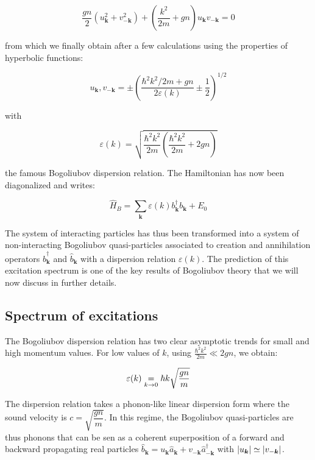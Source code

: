 \begin{equation}
    \frac{g n}{2}\left(u_{\bm{k}}^{2}+v_{-\bm{k}}^{2}\right)+\left(\frac{k^{2}}{2 m}+g n\right) u_{\bm{k}} v_{-\bm{k}}=0
\end{equation}

from which we finally obtain after a few calculations using the properties of hyperbolic functions:

\begin{equation}
    u_{\bm{k}}, v_{-\bm{k}}=\pm\left(\frac{\hbar^2k^{2} / 2 m+g n}{2 \varepsilon(k)} \pm \frac{1}{2}\right)^{1 / 2}
\end{equation}

with 

\begin{equation}
    \varepsilon(k)=\sqrt{\frac{\hbar^2 k^2}{2m}(\frac{\hbar^2 k^2}{2m}+2gn)}
\end{equation}

the famous Bogoliubov dispersion relation. The Hamiltonian has now been diagonalized and writes:

\begin{equation}
    \hat{H}_B = \sum_{\bm{k}}\varepsilon(k) b^{\dagger}_{\bm{k}}  b_{\bm{k}}+E_0
\end{equation}

The system of interacting particles has thus been transformed into a system of non-interacting Bogoliubov quasi-particles associated to creation and annihilation operators $\hat{b}^{\dagger}_{\bm{k}}$ and $\hat{b}_{\bm{k}}$ with a dispersion relation $\varepsilon(k)$. The prediction of this excitation spectrum is one of the key results of Bogoliubov theory that we will now discuss in further details.

\subsection{Spectrum of excitations}

The Bogoliubov dispersion relation has two clear asymptotic trends for small and high momentum values. For low values of $k$, using $\frac{\hbar^2 k^2}{2m} \ll 2gn$, we obtain:

\begin{equation}
    \varepsilon(k) \underrel{k \to 0}{=} \hbar k \sqrt{\frac{gn}{m}}
\end{equation}

The dispersion relation takes a phonon-like linear dispersion form where the sound velocity is $c=\sqrt{\dfrac{gn}{m}}$. In this regime, the Bogoliubov quasi-particles are thus phonons that can be sen as a coherent superposition of a forward and backward propagating real particles $\hat{b}_{\bm{k}}=u_{\bm{k}} \hat{a}_{\bm{k}} + v_{-\bm{k}} \hat{a}^{\dagger}_{-\bm{k}}$ with $\left\lvert u_{\bm{k}}\right\rvert \simeq \left\lvert v_{-\bm{k}}\right\rvert$.

